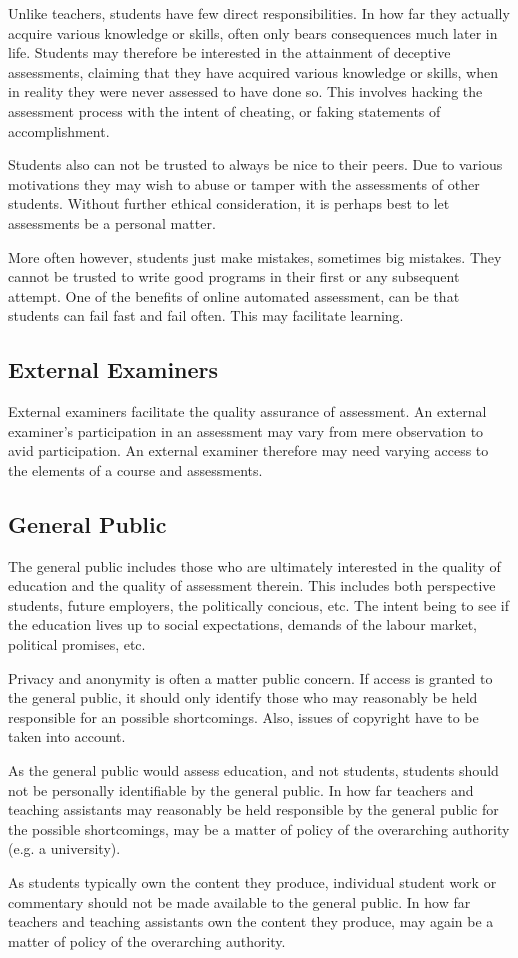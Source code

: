 Unlike teachers, students have few direct responsibilities. In how far they
actually acquire various knowledge or skills, often only bears consequences
much later in life. Students may therefore be interested in the attainment of
deceptive assessments, claiming that they have acquired various knowledge or
skills, when in reality they were never assessed to have done so. This involves
hacking the assessment process with the intent of cheating, or faking
statements of accomplishment.

Students also can not be trusted to always be nice to their peers. Due to
various motivations they may wish to abuse or tamper with the assessments of
other students. Without further ethical consideration, it is perhaps best to
let assessments be a personal matter.

More often however, students just make mistakes, sometimes big mistakes. They
cannot be trusted to write good programs in their first or any subsequent
attempt.  One of the benefits of online automated assessment, can be that
students can fail fast and fail often.  This may facilitate learning.

\subsection{External Examiners}

External examiners facilitate the quality assurance of assessment. An external
examiner's participation in an assessment may vary from mere observation to
avid participation. An external examiner therefore may need varying access to
the elements of a course and assessments.

\subsection{General Public}

The general public includes those who are ultimately interested in the quality
of education and the quality of assessment therein. This includes both
perspective students, future employers, the politically concious, etc. The
intent being to see if the education lives up to social expectations, demands
of the labour market, political promises, etc.

Privacy and anonymity is often a matter public concern. If access is granted to
the general public, it should only identify those who may reasonably be held
responsible for an possible shortcomings. Also, issues of
copyright have to be taken into account.

As the general public would assess education, and not students, students should
not be personally identifiable by the general public. In how far teachers and
teaching assistants may reasonably be held responsible by the general public
for the possible shortcomings, may be a matter of policy of the overarching
authority (e.g.  a university).

As students typically own the content they produce, individual student work or
commentary should not be made available to the general public. In how far
teachers and teaching assistants own the content they produce, may again be a
matter of policy of the overarching authority.
